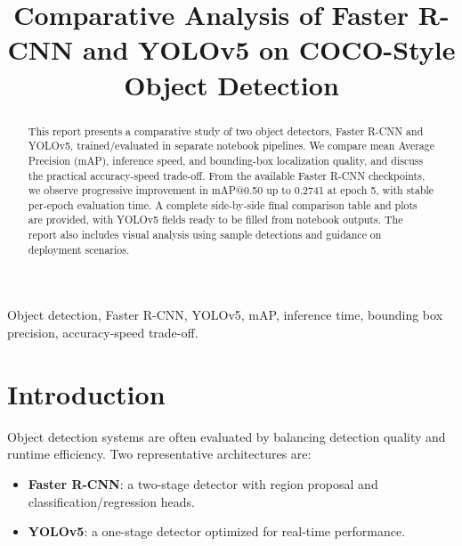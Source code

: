 \documentclass[conference]{IEEEtran}
\begin{document}
\title{Comparative Analysis of Faster R-CNN and YOLOv5 on COCO-Style Object Detection}

\author{
}

\maketitle

\begin{abstract}
This report presents a comparative study of two object detectors, Faster R-CNN and YOLOv5, trained/evaluated in separate notebook pipelines. We compare mean Average Precision (mAP), inference speed, and bounding-box localization quality, and discuss the practical accuracy-speed trade-off. From the available Faster R-CNN checkpoints, we observe progressive improvement in mAP@0.50 up to 0.2741 at epoch 5, with stable per-epoch evaluation time. A complete side-by-side final comparison table and plots are provided, with YOLOv5 fields ready to be filled from notebook outputs. The report also includes visual analysis using sample detections and guidance on deployment scenarios.
\end{abstract}

\begin{IEEEkeywords}
Object detection, Faster R-CNN, YOLOv5, mAP, inference time, bounding box precision, accuracy-speed trade-off.
\end{IEEEkeywords}

\section{Introduction}
Object detection systems are often evaluated by balancing detection quality and runtime efficiency. Two representative architectures are:
\begin{itemize}
    \item \textbf{Faster R-CNN}: a two-stage detector with region proposal and classification/regression heads.
    \item \textbf{YOLOv5}: a one-stage detector optimized for real-time performance.
\end{itemize}
\end{document}
